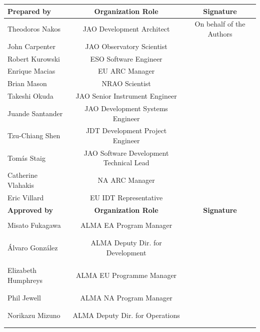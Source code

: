 \begin{center}
\begin{longtable*}{|l|c|c|}
    \hline
    \textbf{Prepared by}     &  \textbf{Organization Role}         & \textbf{Signature} \\ \hline
    \endfirsthead
     Theodoros Nakos    & JAO Development Architect         &    On behalf of the Authors              \\  
     John Carpenter     & JAO Observatory Scientist         &                \\
     Robert Kurowski    & ESO Software Engineer  & \\
     Enrique Macias     & EU ARC Manager                    &               \\
     Brian Mason        & NRAO Scientist  & \\
     Takeshi Okuda      & JAO Senior Instrument Engineer    & \\
     Juande Santander   & JAO Development Systems Engineer  &               \\  
     Tzu-Chiang Shen    & JDT Development Project Engineer  &               \\  
     Tomás Staig        & JAO Software Development Technical Lead & \\
     Catherine Vlahakis & NA ARC Manager                    &                \\
     Eric Villard       & EU IDT Representative             &               \\      \hline
    \textbf{Approved by}     &  \textbf{Organization Role}         & \textbf{Signature} \\ \hline
      &  & \\  
      Misato Fukagawa     & ALMA EA Program Manager           &               \\  
        &  & \\ 
                &  & \\ 
    \'Alvaro Gonz\'alez   & ALMA Deputy Dir. for Development  &                 \\
      &  & \\ 
              &  & \\ 
    Elizabeth Humphreys & ALMA EU Programme Manager           &               \\
      &  & \\         
      &  & \\ 
    Phil Jewell         & ALMA NA Program Manager           &               \\
            &  & \\ 
      &  & \\ 
    Norikazu Mizuno     & ALMA Deputy Dir. for Operations   &               \\
      &  & \\  
     &  & \\ \hline


\end{longtable*}
\end{center}

